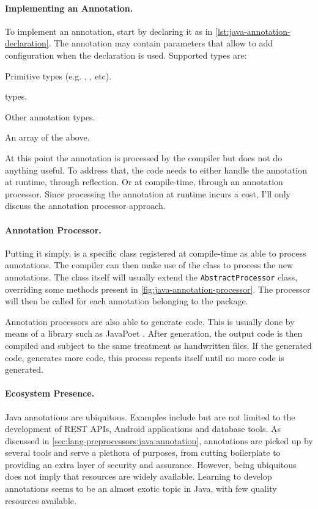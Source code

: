 \paragraph{Implementing an Annotation.}
To implement an annotation, start by declaring it as in \autoref{lst:java-annotation-declaration}.
The annotation may contain parameters that allow to add configuration when the declaration is used.
Supported types are:
\begin{compactitem}
    \item Primitive types (e.g. , , etc).
    \item {}
    \item {}
    \item {} types.
    \item Other annotation types.
    \item An array of the above.
\end{compactitem}
At this point the annotation is processed by the compiler but does not do anything useful.
To address that, the code needs to either handle the annotation at runtime, through reflection.
Or at compile-time, through an annotation processor.
Since processing the annotation at runtime incurs a cost, I'll only discuss the annotation processor approach.

\paragraph{Annotation Processor.}
Putting it simply, is a specific class registered at compile-time as able to process annotations.
The compiler can then make use of the class to process the new annotations.
The class itself will usually extend the \texttt{AbstractProcessor} class,
overriding some methods present in \autoref{fig:java-annotation-processor}.
The processor will then be called for each annotation belonging to the package.

Annotation processors are also able to generate code.
This is usually done by means of a library such as JavaPoet \autocite{Square2021}.
After generation, the output code is then compiled and subject to the same treatment as handwritten files.
If the generated code, generates more code, this process repeats itself until no more code is generated.

\paragraph{Ecosystem Presence.}
Java annotations are ubiquitous.
Examples include but are not limited to the development of REST APIs,
Android applications and database tools.
As discussed in \autoref{sec:lang-preprocessors:java:annotation},
annotations are picked up by several tools and serve a plethora of purposes,
from cutting boilerplate to providing an extra layer of security and assurance.
However, being ubiquitous does not imply that resources are widely available.
Learning to develop annotations seems to be an almost exotic topic in Java,
with few quality resources available.

